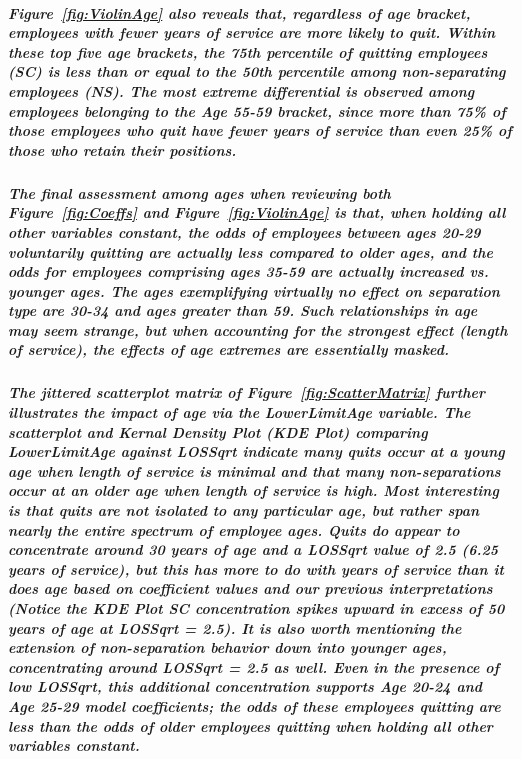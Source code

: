 \documentclass[10pt]{article}
\begin{document}
\subparagraph{Figure~\ref{fig:ViolinAge} also reveals that, regardless of age bracket, employees with fewer years of service are more likely to quit. Within these top five age brackets, the 75th percentile of quitting employees (SC) is less than or equal to the 50th percentile among non-separating employees (NS). The most extreme differential is observed among employees belonging to the Age 55-59 bracket, since more than 75\% of those employees who quit have fewer years of service than even 25\% of those who retain their positions.}

\subparagraph{The final assessment among ages when reviewing both Figure~\ref{fig:Coeffs} and Figure~\ref{fig:ViolinAge} is that, when holding all other variables constant, the odds of employees between ages 20-29 voluntarily quitting are actually less compared to older ages, and the odds for employees comprising ages 35-59 are actually increased vs. younger ages. The ages exemplifying virtually no effect on separation type are 30-34 and ages greater than 59. Such relationships in age may seem strange, but when accounting for the strongest effect (length of service), the effects of age extremes are essentially masked.}

\subparagraph{The jittered scatterplot matrix of Figure~\ref{fig:ScatterMatrix} further illustrates the impact of age via the LowerLimitAge variable. The scatterplot and Kernal Density Plot (KDE Plot) comparing LowerLimitAge against LOSSqrt indicate many quits occur at a young age when length of service is minimal and that many non-separations occur at an older age when length of service is high. Most interesting is that quits are not isolated to any particular age, but rather span nearly the entire spectrum of employee ages. Quits do appear to concentrate around 30 years of age and a LOSSqrt value of 2.5 (6.25 years of service), but this has more to do with years of service than it does age based on coefficient values and our previous interpretations (Notice the KDE Plot SC concentration spikes upward in excess of 50 years of age at LOSSqrt = 2.5). It is also worth mentioning the extension of non-separation behavior down into younger ages, concentrating around LOSSqrt = 2.5 as well. Even in the presence of low LOSSqrt, this additional concentration supports Age 20-24 and Age 25-29 model coefficients; the odds of these employees quitting are less than the odds of older employees quitting when holding all other variables constant.}
\end{document}
